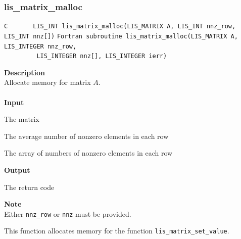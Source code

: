 \documentclass[a4paper]{article}
\newcommand{\namelistlabel}[1]{\mbox{#1}\hfill}
\newenvironment{namelist}[1]{%
\begin{list}{}
  {\let\makelabel\namelistlabel
  \settowidth{\labelwidth}{#1}
  \setlength{\leftmargin}{1.1\labelwidth}}
  }{%
\end{list}}
\begin{document}
\subsubsection{lis\_matrix\_malloc}
\begin{screen}
\verb|C       LIS_INT lis_matrix_malloc(LIS_MATRIX A, LIS_INT nnz_row, LIS_INT nnz[])|
\verb|Fortran subroutine lis_matrix_malloc(LIS_MATRIX A, LIS_INTEGER nnz_row,|\\
\verb|         LIS_INTEGER nnz[], LIS_INTEGER ierr)|
\end{screen}
{\bf Description}\\
\indent
Allocate memory for matrix $A$.
\\ \\
\noindent
{\bf Input}
\begin{namelist}{XXXXXXXXXXXXXXXXXXXX}
\item[\tt A] The matrix
\item[\tt nnz\_row] The average number of nonzero elements in each row
\item[\tt nnz] The array of numbers of nonzero elements in each row
\end{namelist}
{\bf Output}
\begin{namelist}{XXXXXXXXXXXXXXXXXXXX}
\item[\tt ierr] The return code
\end{namelist}
{\bf Note}\\
\indent
Either \verb|nnz_row| or \verb|nnz| must be provided.

This function allocates memory for the function \verb|lis_matrix_set_value|.

\newpage
\end{document}
